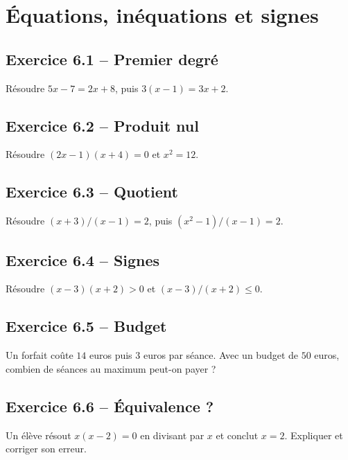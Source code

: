 \chapter{Équations, inéquations et signes}
\section*{Exercice 6.1 -- Premier degré}
Résoudre $5x-7=2x+8$, puis $3(x-1)=3x+2$.

\section*{Exercice 6.2 -- Produit nul}
Résoudre $(2x-1)(x+4)=0$ et $x^2=12$.

\section*{Exercice 6.3 -- Quotient}
Résoudre $(x+3)/(x-1)=2$, puis $(x^2-1)/(x-1)=2$.

\section*{Exercice 6.4 -- Signes}
Résoudre $(x-3)(x+2)>0$ et $(x-3)/(x+2)\leq0$.

\section*{Exercice 6.5 -- Budget}
Un forfait coûte $14$ euros puis $3$ euros par séance. Avec un budget de $50$ euros, combien de séances au maximum peut-on payer ?

\section*{Exercice 6.6 -- Équivalence ?}
Un élève résout $x(x-2)=0$ en divisant par $x$ et conclut $x=2$. Expliquer et corriger son erreur.
